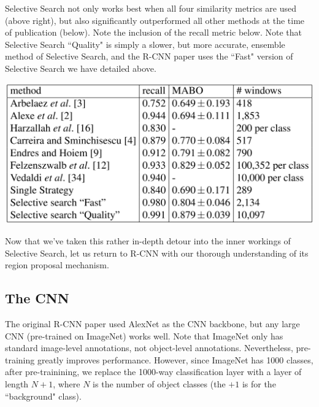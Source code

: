 \documentclass{article}
\begin{document}
Selective Search not only works best when all four similarity metrics are used (above right), but also significantly outperformed all other methods at the time of publication (below). Note the inclusion of the recall metric below. Note that Selective Search ``Quality" is simply a slower, but more accurate, ensemble method of Selective Search, and the R-CNN paper uses the ``Fast" version of Selective Search we have detailed above.

\begin{center}
\includegraphics[scale=0.4]{performance.PNG}
\end{center}

Now that we've taken this rather in-depth detour into the inner workings of Selective Search, let us return to R-CNN with our thorough understanding of its region proposal mechanism.

\subsection{The CNN}
The original R-CNN paper used AlexNet as the CNN backbone, but any large CNN (pre-trained on ImageNet) works well. Note that ImageNet only has standard image-level annotations, not object-level annotations. Nevertheless, pre-training greatly improves performance. However, since ImageNet has 1000 classes, after pre-trainining, we replace the 1000-way classification layer with a layer of length $N+1$, where $N$ is the number of object classes (the $+1$ is for the ``background" class).
\end{document}
